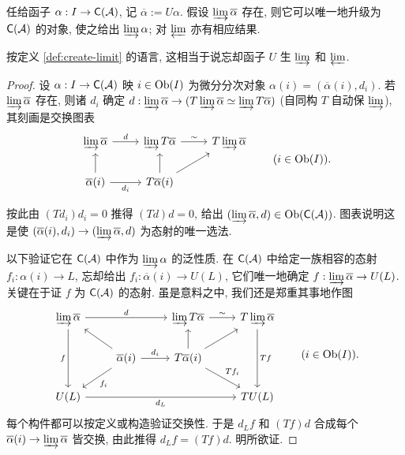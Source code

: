 \begin{lemma}[极限的逐项构造]\label{prop:limits-cplx}
	任给函子 $\alpha: I \to \mathsf{C}(\mathcal{A})$, 记 $\overline{\alpha} := U\alpha$. 假设 $\varinjlim \overline{\alpha}$ 存在, 则它可以唯一地升级为 $\mathsf{C}(\mathcal{A})$ 的对象, 使之给出 $\varinjlim \alpha$; 对 $\varprojlim$ 亦有相应结果.

	按定义 \ref{def:create-limit} 的语言, 这相当于说忘却函子 $U$ 生 $\varinjlim$ 和 $\varprojlim$.
\end{lemma}
\begin{proof}
	设 $\alpha: I \to \mathsf{C}(\mathcal{A})$ 映 $i \in \operatorname{Ob}(I)$ 为微分分次对象 $\alpha(i) = (\overline{\alpha}(i), d_i)$. 若 $\varinjlim \overline{\alpha}$ 存在, 则诸 $d_i$ 确定 $d: \varinjlim \overline{\alpha} \to (T\varinjlim \overline{\alpha} \simeq \varinjlim T\overline{\alpha})$ (自同构 $T$ 自动保 $\varinjlim$), 其刻画是交换图表
	\[\begin{tikzcd}
		\varinjlim \overline{\alpha} \arrow[r, "d"] & \varinjlim T\overline{\alpha} \arrow[r, "\sim"] & T\varinjlim \overline{\alpha} \\
		\overline{\alpha}(i) \arrow[u] \arrow[r, "{d_i}"'] & T\overline{\alpha}(i) \arrow[u] \arrow[ru] &
	\end{tikzcd} \qquad (i \in \Obj(I)) . \]

	按此由 $(Td_i) d_i = 0$ 推得 $(Td)d = 0$, 给出 $(\varinjlim \overline{\alpha}, d) \in \operatorname{Ob}(\mathsf{C}(\mathcal{A}))$. 图表说明这是使 $(\overline{\alpha}(i), d_i) \to (\varinjlim \overline{\alpha}, d)$ 为态射的唯一选法.
	
	以下验证它在 $\mathsf{C}(\mathcal{A})$ 中作为 $\varinjlim \alpha$ 的泛性质. 在 $\mathsf{C}(\mathcal{A})$ 中给定一族相容的态射 $f_i: \alpha(i) \to L$, 忘却给出 $f_i: \overline{\alpha}(i) \to U(L)$, 它们唯一地确定 $f: \varinjlim \overline{\alpha} \to U(L)$. 关键在于证 $f$ 为 $\mathsf{C}(\mathcal{A})$ 的态射. 虽是意料之中, 我们还是郑重其事地作图
	\[\begin{tikzcd}
		\varinjlim \overline{\alpha} \arrow[dd, "f"'] \arrow[rr, "d"] & & \varinjlim T\overline{\alpha} \arrow[r, "\sim"] & T\varinjlim \overline{\alpha} \arrow[dd, "{Tf}"] \\
		& \overline{\alpha}(i) \arrow[lu] \arrow[ld, "{f_i}"] \arrow[r, "d_i"] & T\overline{\alpha}(i) \arrow[ru] \arrow[rd, "{Tf_i}"] \arrow[u] & \\
		U(L) \arrow[rrr, "d_L"'] & & & TU(L)
	\end{tikzcd} \qquad (i \in \Obj(I)). \]
	每个构件都可以按定义或构造验证交换性. 于是 $d_L f$ 和 $(Tf)d$ 合成每个 $\overline{\alpha}(i) \to \varinjlim \overline{\alpha}$ 皆交换, 由此推得 $d_L f = (Tf) d$. 明所欲证.
\end{proof}

